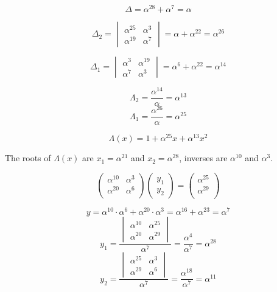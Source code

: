 \documentclass[11pt]{article}
\begin{document}
\[Δ = α^{28} + α^{7} = α\]

\begin{equation}
Δ_2 =
\begin{vmatrix}
α^{25} & α^{3}\\
α^{19} & α^{7}
\end{vmatrix}
= α + α^{22} = α^{26}
\end{equation}

\begin{equation}
Δ_1 =
\begin{vmatrix}
α^{3} & α^{19}\\
α^{7} & α^{3}
\end{vmatrix}
= α^{6} + α^{22} = α^{14}
\end{equation}

\[Λ_2 = \frac{α^{14}}{α} = α^{13}\] \[Λ_1 = \frac{α^{26}}{α} = α^{25}\]

\[Λ(x) = 1 + α^{25}x + α^{13}x^2\]

The roots of \(Λ(x)\) are \(x_1= α^{21}\) and \(x_2 = α^{28}\), inverses
are \(α^{10}\) and \(α^{3}\).

\begin{equation}
\begin{pmatrix}
α^{10} & α^{3}\\
α^{20} & α^{6}\\
\end{pmatrix}
\begin{pmatrix}
y_1\\
y_2
\end{pmatrix}
=
\begin{pmatrix}
α^{25}\\
α^{29}\\
\end{pmatrix}
\end{equation}

\[y = α^{10}⋅α^{6} + α^{20}⋅α^{3} = α^{16} + α^{23} = α^{7}\]
\begin{equation}
y_1 =\frac{
\begin{vmatrix}
α^{10} & α^{25}\\
α^{20} & α^{29}
\end{vmatrix}}{α^7}
= \frac{α^{4}}{α^7} = α^{28}
\end{equation} \begin{equation}
y_2 =\frac{
\begin{vmatrix}
α^{25} & α^{3}\\
α^{29} & α^{6}
\end{vmatrix}}{α^7}
= \frac{α^{18}}{α^7} = α^{11}
\end{equation}
\end{document}
